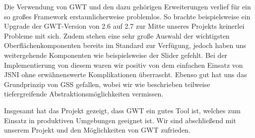 Die Verwendung von GWT und den dazu gehörigen Erweiterungen verlief für ein so großes Framework erstaunlicherweise problemlos.
So brachte beispielsweise ein Upgrade der GWT-Version von 2.6 auf 2.7 zur Mitte unseres Projekts keinerlei Probleme mit sich. Zudem stehen eine sehr große Auswahl der wichtigsten Oberflächenkomponenten bereits im Standard zur Verfügung, jedoch haben uns weitergehende Komponenten wie beispielsweise der Slider gefehlt. Bei der Implementierung von diesem waren wir positiv von dem einfachen Einsatz von JSNI ohne erwähnenswerte Komplikationen überrascht. Ebenso gut hat uns das Grundprinzip von GSS gefallen, wobei wir wie beschrieben teilweise tiefergreifende Abstraktionsmöglichkeiten vermissen.

Insgesamt hat das Projekt gezeigt, dass GWT ein gutes Tool ist, welches zum Einsatz in produktiven Umgebungen geeignet ist. Wir sind abschließend mit unserem Projekt und den Möglichkeiten von GWT zufrieden.

